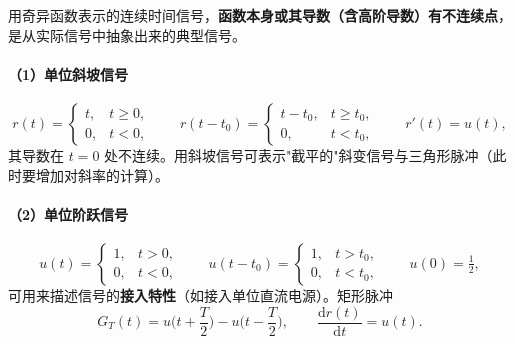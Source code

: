 用奇异函数表示的连续时间信号，\textbf{函数本身或其导数（含高阶导数）有不连续点}，
是从实际信号中抽象出来的典型信号。

\paragraph{（1）单位斜坡信号}
\begin{equation}
r(t)=
\begin{cases}
t, & t\ge0,\\
0, & t<0,
\end{cases}
\qquad
r(t-t_0)=
\begin{cases}
t-t_0, & t\ge t_0,\\
0, & t<t_0,
\end{cases}
\qquad r'(t)=u(t),
\end{equation}
其导数在 $t=0$ 处不连续。用斜坡信号可表示"截平的"斜变信号与三角形脉冲（此时要增加对斜率的计算）。

\paragraph{（2）单位阶跃信号}
\begin{equation}
u(t)=
\begin{cases}
1, & t>0,\\
0, & t<0,
\end{cases}
\qquad
u(t-t_0)=
\begin{cases}
1, & t>t_0,\\
0, & t<t_0,
\end{cases}
\qquad u(0)=\tfrac12,
\end{equation}
可用来描述信号的\textbf{接入特性}（如接入单位直流电源）。矩形脉冲
\begin{equation}
G_T(t)=u\Big(t+\frac{T}{2}\Big)-u\Big(t-\frac{T}{2}\Big),
\qquad
\frac{\mathrm{d}r(t)}{\mathrm{d}t}=u(t).
\end{equation}

